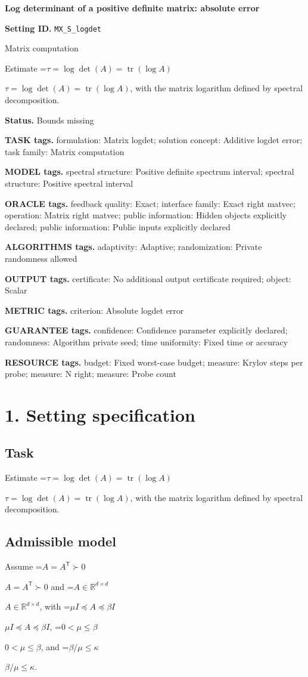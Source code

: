 \documentclass[10pt,a4paper]{article}
\newcommand{\AtlasMath}[1]{\par\begingroup\centering\setbox0=\hbox{$\displaystyle #1$}\ifdim\wd0>1.4\linewidth\typeout{ATLAS WIDE FORMULA: \the\wd0}\fi\ifdim\wd0>\linewidth\resizebox{\linewidth}{!}{\box0}\else\box0\fi\par\endgroup}
\newcommand{\AtlasInlineMath}[1]{\begingroup\setbox0=\hbox{$#1$}\ifdim\wd0>.4\linewidth\endgroup\AtlasMath{#1}\else\endgroup$#1$\fi}
\begin{document}
\raggedright

{\LARGE\bfseries\sffamily\color{AtlasNavy} Log determinant of a positive definite matrix: absolute error\par}\vspace{5pt}
\textbf{Setting ID.} \texttt{MX\_\allowbreak{}S\_\allowbreak{}logdet}

Matrix computation

Estimate \AtlasInlineMath{\tau=\log\det(A)=\operatorname{tr}(\log A)}, with the matrix logarithm defined by spectral decomposition.

\textbf{Status.} Bounds missing

\textbf{TASK tags.} formulation: Matrix logdet; solution concept: Additive logdet error; task family: Matrix computation

\textbf{MODEL tags.} spectral structure: Positive definite spectrum interval; spectral structure: Positive spectral interval

\textbf{ORACLE tags.} feedback quality: Exact; interface family: Exact right matvec; operation: Matrix right matvec; public information: Hidden objects explicitly declared; public information: Public inputs explicitly declared

\textbf{ALGORITHMS tags.} adaptivity: Adaptive; randomization: Private randomness allowed

\textbf{OUTPUT tags.} certificate: No additional output certificate required; object: Scalar

\textbf{METRIC tags.} criterion: Absolute logdet error

\textbf{GUARANTEE tags.} confidence: Confidence parameter explicitly declared; randomness: Algorithm private seed; time uniformity: Fixed time or accuracy

\textbf{RESOURCE tags.} budget: Fixed worst-case budget; measure: Krylov steps per probe; measure: N right; measure: Probe count

\section{1. Setting specification}
\subsection{Task}
Estimate \AtlasInlineMath{\tau=\log\det(A)=\operatorname{tr}(\log A)}, with the matrix logarithm defined by spectral decomposition.

\subsection{Admissible model}
Assume \AtlasInlineMath{A=A^{\mathsf T}\succ0} and \AtlasInlineMath{A\in\mathbb{R}^{d\times d}}, with \AtlasInlineMath{\mu I\preceq A\preceq\beta I}, \AtlasInlineMath{0<\mu\le\beta}, and \AtlasInlineMath{\beta/\mu\le\kappa}.
\end{document}
